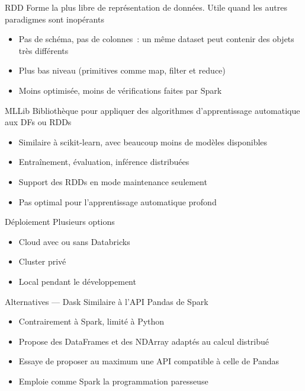 \begin{frame}{RDD}
  Forme la plus libre de représentation de données. Utile quand les autres paradigmes sont inopérants

  \begin{itemize}
    \item Pas de schéma, pas de colonnes~: un même dataset peut contenir des objets très différents
    \item Plus bas niveau (primitives comme map, filter et reduce)
    \item Moins optimisée, moins de vérifications faites par Spark
  \end{itemize}
\end{frame}

\begin{frame}{MLLib}
  Bibliothèque pour appliquer des algorithmes d'apprentissage automatique aux DFs ou RDDs

  \begin{itemize}
    \item Similaire à scikit-learn, avec beaucoup moins de modèles disponibles
    \item Entraînement, évaluation, inférence distribuées
    \item Support des RDDs en mode maintenance seulement
    \item Pas optimal pour l'apprentissage automatique profond
  \end{itemize}
\end{frame}

\begin{frame}{Déploiement}
  Plusieurs options

  \begin{itemize}
    \item Cloud avec ou sans Databricks
    \item Cluster privé
    \item Local pendant le développement
  \end{itemize}
\end{frame}

\begin{frame}{Alternatives --- Dask}
  Similaire à l'API Pandas de Spark

  \begin{itemize}
    \item Contrairement à Spark, limité à Python
    \item Propose des DataFrames et des NDArray adaptés au calcul distribué
    \item Essaye de proposer au maximum une API compatible à celle de Pandas
    \item Emploie comme Spark la programmation paresseuse
  \end{itemize}
\end{frame}
